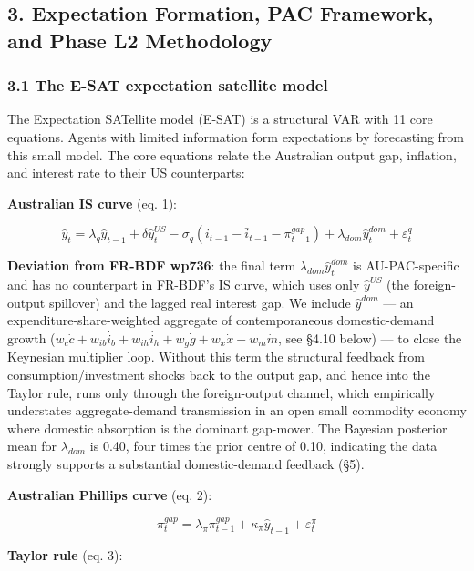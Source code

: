 \documentclass[
]{article}
\begin{document}
\subsection{3. Expectation Formation, PAC Framework, and Phase L2
Methodology}\label{expectation-formation-pac-framework-and-phase-l2-methodology}

\subsubsection{3.1 The E-SAT expectation satellite
model}\label{the-e-sat-expectation-satellite-model}

The Expectation SATellite model (E-SAT) is a structural VAR with 11 core
equations. Agents with limited information form expectations by
forecasting from this small model. The core equations relate the
Australian output gap, inflation, and interest rate to their US
counterparts:

\textbf{Australian IS curve} (eq. 1):

\[\hat{y}_t = \lambda_q \hat{y}_{t-1} + \delta \hat{y}^{US}_t - \sigma_q (i_{t-1} - \bar{i}_{t-1} - \pi^{gap}_{t-1}) + \lambda_{dom} \hat{y}^{dom}_t + \varepsilon^q_t\]

\textbf{Deviation from FR-BDF wp736}: the final term
\(\lambda_{dom} \hat{y}^{dom}_t\) is AU-PAC-specific and has no
counterpart in FR-BDF's IS curve, which uses only \(\hat{y}^{US}\) (the
foreign-output spillover) and the lagged real interest gap. We include
\(\hat{y}^{dom}\) --- an expenditure-share-weighted aggregate of
contemporaneous domestic-demand growth
(\(w_c \dot{c} + w_{ib} \dot{i_b} + w_{ih} \dot{i_h} + w_g \dot{g} + w_x \dot{x} - w_m \dot{m}\),
see §4.10 below) --- to close the Keynesian multiplier loop. Without
this term the structural feedback from consumption/investment shocks
back to the output gap, and hence into the Taylor rule, runs only
through the foreign-output channel, which empirically understates
aggregate-demand transmission in an open small commodity economy where
domestic absorption is the dominant gap-mover. The Bayesian posterior
mean for \(\lambda_{dom}\) is 0.40, four times the prior centre of 0.10,
indicating the data strongly supports a substantial domestic-demand
feedback (§5).

\textbf{Australian Phillips curve} (eq. 2):

\[\pi^{gap}_t = \lambda_\pi \pi^{gap}_{t-1} + \kappa_\pi \hat{y}_{t-1} + \varepsilon^\pi_t\]

\textbf{Taylor rule} (eq. 3):
\end{document}
